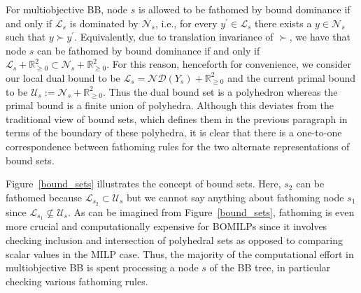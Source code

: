 \documentclass[11.5pt]{article}
\newcommand{\bb}{BB}
\newcommand{\R}{\mathbb{R}}
\newcommand{\dom}{\succ}
\newcommand{\U}{\mathcal{U}}
\renewcommand{\L}{\mathcal{L}}
\newcommand{\N}{\mathcal{N}}
\newcommand{\nonneg}{\R^{2}_{\ge 0}}
\newcommand{\nd}[1]{\mathcal{ND}(#1)}
\newcommand{\comment}[1]{{\color{red} #1}}
\begin{document}
{For multiobjective \bb{}, node $s$ is allowed to be fathomed by bound dominance if and only if $\L_{s}$ is dominated by $\N_{s}$, i.e., for every $y^{\prime}\in\L_{s}$ there exists a $y\in\N_{s}$ such that $y \dom y^{\prime}$. Equivalently, due to translation invariance of $\dom$, we have that node $s$ can be fathomed by bound dominance if and only if $\L_{s}+\nonneg \subset \N_{s}+\nonneg$. For this reason, henceforth for convenience, we consider our local dual bound to be $\L_{s}=\nd{Y_{s}}+\nonneg$ and the current primal bound to be $\U_{s}:=\N_{s}+\nonneg$. Thus the dual bound set is a polyhedron whereas the primal bound is a finite union of polyhedra. Although this deviates from the traditional view of bound sets, which defines them in the previous paragraph in terms of the boundary of these polyhedra, it is clear that there is a one-to-one correspondence between fathoming rules for the two alternate representations of bound sets.

Figure~\ref{bound_sets} illustrates the concept of bound sets. Here, $s_2$ can be fathomed because $\L_{s_{2}}\subset\U_{s}$ but we cannot say anything about fathoming node $s_1$ since $\L_{s_{1}}\nsubseteq\U_{s}$. As can be imagined from Figure~\ref{bound_sets}, fathoming is even more crucial and computationally expensive for BOMILPs since it involves checking inclusion and intersection of polyhedral sets as opposed to comparing scalar values in the MILP case. Thus, the majority of the computational effort in multiobjective BB is spent processing a node $s$ of the BB tree, in particular checking various fathoming rules.


}
\end{document}
